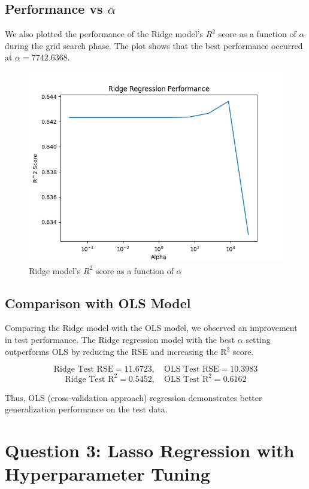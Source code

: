 \documentclass[a4paper,12pt]{article}
\begin{document}
\subsection*{Performance vs \(\alpha\)}
We also plotted the performance of the Ridge model's $R^2$ score as a function of \(\alpha\) during the grid search phase. The plot shows that the best performance occurred at \(\alpha = 7742.6368\).
\begin{figure}[H]
    \centering
    \includegraphics[width=1\linewidth]{Results/Q2/ridge.png}
    \caption{Ridge model's $R^2$ score as a function of \(\alpha\)}
    \label{fig:enter-label}
\end{figure}


\subsection*{Comparison with OLS Model}
Comparing the Ridge model with the OLS model, we observed an improvement in test performance. The Ridge regression model with the best \(\alpha\) setting outperforms OLS by reducing the RSE and increasing the R\(^2\) score.

\[
\text{Ridge Test RSE} = 11.6723, \quad \text{OLS Test RSE} = 10.3983
\]
\[
\text{Ridge Test R}^2 = 0.5452, \quad \text{OLS Test R}^2 = 0.6162
\]

Thus, OLS (cross-validation approach) regression demonstrates better generalization performance on the test data.

\section*{Question 3: Lasso Regression with Hyperparameter Tuning}
\end{document}
